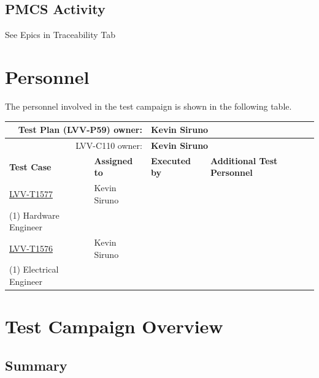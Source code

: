 \documentclass[SE,lsstdraft,STR,toc]{lsstdoc}
\begin{document}
  \subsection{PMCS Activity}
  See Epics in Traceability Tab


\newpage
\section{Personnel}
\label{sect:personnel}

The personnel involved in the test campaign is shown in the following table.

\begin{longtable}{p{3cm}p{3cm}p{3cm}p{6cm}}
\hline
\multicolumn{2}{r}{Test Plan (LVV-P59) owner:} &
\multicolumn{2}{l}{\textbf{ Kevin Siruno } }\\\hline
\multicolumn{2}{r}{ LVV-C110 owner:} &
\multicolumn{2}{l}{\textbf{
    Kevin Siruno
}
} \\\hline
\textbf{Test Case} & \textbf{Assigned to} & \textbf{Executed by} & \textbf{Additional Test Personnel} \\ \hline
\href{https://jira.lsstcorp.org/secure/Tests.jspa#/testCase/LVV-T1577}{LVV-T1577}
& {\small Kevin Siruno } & {\small  } &
\begin{minipage}[]{6cm}
\smallskip
{\small (1) Software Engineer\\
(1) Hardware Engineer
 }
\medskip
\end{minipage}
\\ \hline
\href{https://jira.lsstcorp.org/secure/Tests.jspa#/testCase/LVV-T1576}{LVV-T1576}
& {\small Kevin Siruno } & {\small  } &
\begin{minipage}[]{6cm}
\smallskip
{\small (1) Mechanical Engineer/Optical Engineer\\
(1) Electrical Engineer
 }
\medskip
\end{minipage}
\\ \hline
\end{longtable}

\newpage

\section{Test Campaign Overview}
\label{sect:overview}

\subsection{Summary}
\label{sect:summarytable}
\end{document}

